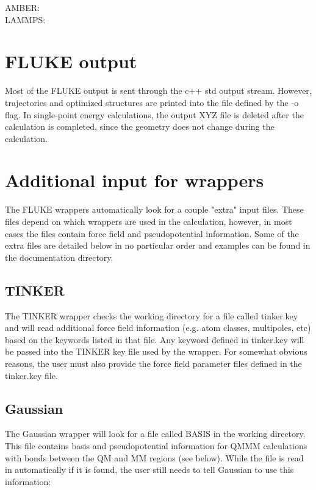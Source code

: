 \documentclass[12pt]{report}
\begin{document}
AMBER: \\

LAMMPS:

\section{FLUKE output}

Most of the FLUKE output is sent through the c++ std output stream. However,
trajectories and optimized structures are printed into the file defined
by the -o flag. In single-point energy calculations, the output XYZ file
is deleted after the calculation is completed, since the geometry does not
change during the calculation.

\section{Additional input for wrappers}

The FLUKE wrappers automatically look for a couple "extra" input files. These
files depend on which wrappers are used in the calculation, however, in most
cases the files contain force field and pseudopotential information. Some of
the extra files are detailed below in no particular order and examples can be
found in the documentation directory.

\subsection{TINKER}

The TINKER wrapper checks the working directory for a file called tinker.key
and will read additional force field information (e.g. atom classes,
multipoles, etc) based on the keywords listed in that file. Any keyword
defined in tinker.key will be passed into the TINKER key file used by the
wrapper. For somewhat obvious reasons, the user must also provide the force
field parameter files defined in the tinker.key file.

\subsection{Gaussian}

The Gaussian wrapper will look for a file called BASIS in the working
directory. This file contains basis and pseudopotential information for
QMMM calculations with bonds between the QM and MM regions (see below).
While the file is read in automatically if it is found, the user still needs
to tell Gaussian to use this information: \\
\end{document}
